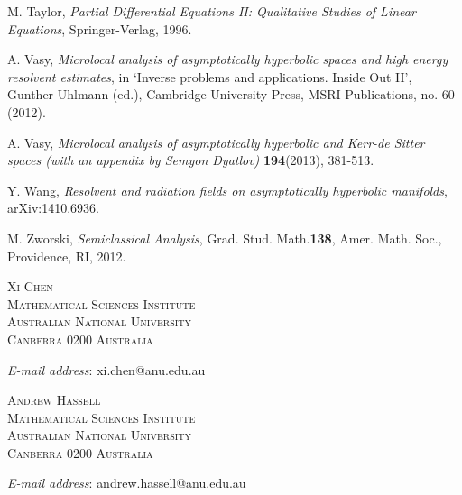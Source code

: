 \documentclass[10pt, a4paper, twoside]{amsart}
\numberwithin{equation}{section}
\theoremstyle{remark}
\begin{document}
\begin{thebibliography}{99}
M. Taylor, \emph{Partial Differential Equations II: Qualitative Studies of Linear Equations}, Springer-Verlag, 1996.

 A. Vasy, \emph{Microlocal analysis of asymptotically hyperbolic spaces and high energy resolvent estimates}, in  `Inverse problems and applications. Inside Out II', Gunther Uhlmann (ed.), Cambridge University Press, MSRI Publications, no. 60 (2012).

 A. Vasy, \emph{Microlocal analysis of asymptotically hyperbolic and Kerr-de Sitter spaces (with an appendix by Semyon Dyatlov)} \textbf{194}(2013), 381-513.

Y. Wang, \emph{Resolvent and radiation fields on asymptotically hyperbolic manifolds}, arXiv:1410.6936. 

M. Zworski, \emph{Semiclassical Analysis}, Grad. Stud. Math.\textbf{138}, Amer. Math. Soc., Providence, RI, 2012.

\end{thebibliography}

\begin{flushleft}
\vspace{0.3cm}\textsc{Xi Chen\\Mathematical Sciences
Institute\\Australian National University\\Canberra 0200 Australia}

\emph{E-mail address}: \textsf{xi.chen@anu.edu.au}

\end{flushleft}

\begin{flushleft}
\vspace{0.3cm}\textsc{Andrew Hassell\\Mathematical Sciences
Institute\\Australian National University\\Canberra 0200 Australia}

\emph{E-mail address}: \textsf{andrew.hassell@anu.edu.au}

\end{flushleft}
\end{document}
